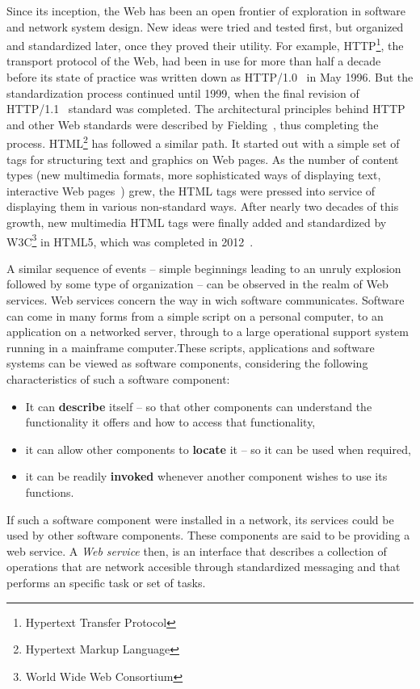 Since its inception, the Web has been an open frontier of exploration in software and network system design. New ideas were tried and tested first, but organized and standardized later, once they proved their utility. For example, HTTP\footnote{Hypertext Transfer Protocol}, the transport protocol of the Web, had been in use for more than half a decade before its state of practice was written down as HTTP/1.0~\cite{rfc1945} in May 1996. But the standardization process continued until 1999, when the final revision of HTTP/1.1~\cite{Fielding:1999} standard was completed. The architectural principles behind HTTP and other Web standards were described by Fielding~\cite{Fielding00Phd}, thus completing the process. HTML\footnote{Hypertext Markup Language} has followed a similar path. It started out with a simple set of tags for structuring text and graphics on Web pages. As the number of content types (new multimedia formats, more sophisticated ways of displaying text, interactive Web pages~\cite{Gar05}) grew, the HTML tags were pressed into service of displaying them in various non-standard ways. After nearly two decades of this growth, new multimedia HTML tags were finally added and standardized by W3C\footnote{World Wide Web Consortium} in HTML5, which was completed in 2012~\cite{Hickson2010}.

A similar sequence of events -- simple beginnings leading to an unruly explosion followed by some type of organization -- can be observed in the realm of Web services. Web services concern the way in wich software communicates. Software can come in many forms from a simple script on a personal computer, to an application on a networked server, through to a large operational support system running in a mainframe computer.These scripts, applications and software systems can be viewed as software components, considering the following characteristics of such a software component:

\begin{itemize}
\item It can \textbf{describe} itself -- so that other components can understand the functionality it offers and how to access that functionality,
\item it can allow other components to \textbf{locate} it -- so it can be used when required,
\item it can be readily \textbf{invoked} whenever another component wishes to use its functions.
\end{itemize}

If such a software component were installed in a network, its services could be used by other software components. These components are said to be providing a web service. A \textit{Web service} then, is an interface that describes a collection of operations that are network accesible through standardized messaging and that performs an specific task or set of tasks\cite{Gottschalk:2002,Muschamp:2004}.

